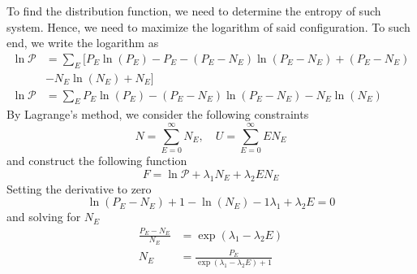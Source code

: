 \documentclass[../../../Main.tex]{subfiles}
\begin{document}
To find the distribution function, we need to determine the entropy of such system. Hence, we need to maximize the logarithm of said configuration. To such end, we write the logarithm as 
\begin{align*}
    \ln \mathcal{P}&= \sum_E \big[P_E\ln (P_E)- P_E - (P_E-N_E)\ln (P_E-N_E)+ (P_E-N_E) \\
    &- N_E\ln (N_E) + N_E \big]\\
    \ln \mathcal{P}&= \sum_E P_E\ln (P_E) - (P_E-N_E)\ln (P_E-N_E) - N_E\ln (N_E)
\end{align*}
By Lagrange's method, we consider the following constraints
\begin{equation*}
    N=\sum_{E=0}^{\infty}N_E,\quad U=\sum_{E=0}^{\infty}EN_E
\end{equation*}
and construct the following function
\begin{equation*}
    F=\ln \mathcal{P}+\lambda_1 N_E+ \lambda_2 E N_E
\end{equation*}
Setting the derivative to zero
\begin{equation*}
    \ln(P_E- N_E)+1 -\ln(N_E)-1\lambda_1 +\lambda_2E =0
\end{equation*}
and solving for $N_E$
\begin{align*}
    \frac{P_E-N_E}{N_E}&=\exp(\lambda_1 -\lambda_2E)\\
    N_E&=\frac{P_E}{\exp(\lambda_1 -\lambda_2E)+1}
\end{align*}
\end{document}
